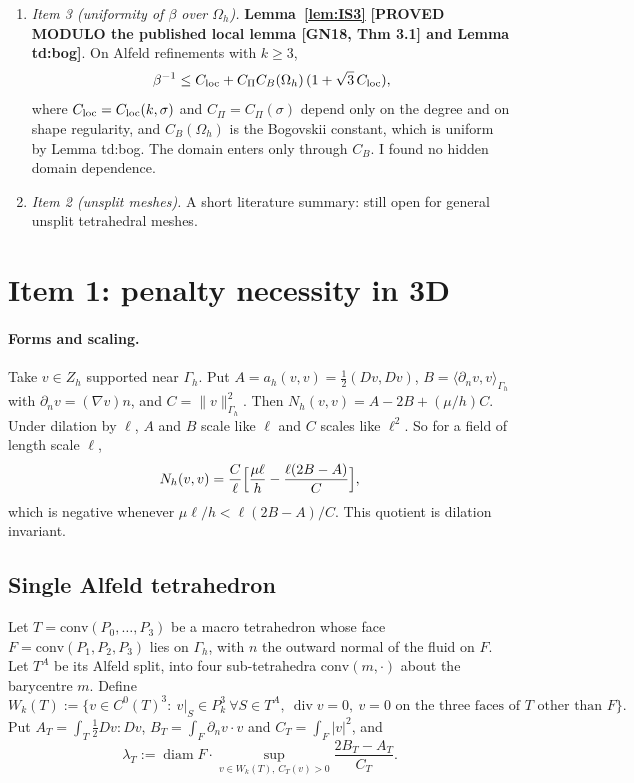 \documentclass[11pt]{article}
\theoremstyle{remark}\newtheorem{remark}[theorem]{Remark}
\newcommand{\Oh}{\Omega_h}\newcommand{\Gh}{\Gamma_h}\newcommand{\hG}{h_\Gamma}\newcommand{\dn}{\partial_n}
\newcommand{\norm}[1]{\|#1\|}\newcommand{\ip}[2]{\langle #1,#2\rangle}\DeclareMathOperator{\curl}{curl}\DeclareMathOperator{\diam}{diam}
\newcommand{\lab}[1]{\textbf{[#1]}}
\begin{document}
\begin{enumerate}[label=(\arabic*)]
\begin{itemize}
\begin{itemize}
 \item This holds for every shape of $T$, including tall ones. \lab{PROVED MODULO (IS3)}, which is itself proved uniform in item~3; $\kappa_0$ is not explicit.
 \end{itemize}
 \end{itemize}
\item \emph{Item 3 (uniformity of $\beta$ over $\Oh$).} \textbf{Lemma~\ref{lem:IS3}} \lab{PROVED MODULO the published local lemma [GN18, Thm 3.1] and Lemma td:bog}. On Alfeld refinements with $k\ge3$,
\[\beta^{-1}\le C_{\rm loc}+C_\Pi C_B(\Oh)\,(1+\sqrt3\,C_{\rm loc}),\]
where $C_{\rm loc}=C_{\rm loc}(k,\sigma)$ and $C_\Pi=C_\Pi(\sigma)$ depend only on the degree and on shape regularity, and $C_B(\Oh)$ is the Bogovskii constant, which is uniform by Lemma td:bog. The domain enters only through $C_B$. I found no hidden domain dependence.
\item \emph{Item 2 (unsplit meshes).} A short literature summary: still open for general unsplit tetrahedral meshes.
\end{enumerate}

\section{Item 1: penalty necessity in 3D}
\paragraph{Forms and scaling.} Take $v\in Z_h$ supported near $\Gh$. Put $A=a_h(v,v)=\tfrac12(Dv,Dv)$, $B=\ip{\dn v}{v}_{\Gh}$ with $\dn v=(\nabla v)n$, and $C=\norm v^2_{\Gh}$. Then $N_h(v,v)=A-2B+(\mu/h)C$. Under dilation by $\ell$, $A$ and $B$ scale like $\ell$ and $C$ scales like $\ell^2$. So for a field of length scale $\ell$,
\[N_h(v,v)=\frac{C}{\ell}\Bigl[\frac{\mu\ell}{h}-\frac{\ell(2B-A)}{C}\Bigr],\]
which is negative whenever $\mu\ell/h<\ell(2B-A)/C$. This quotient is dilation invariant.

\subsection{Single Alfeld tetrahedron}
Let $T=\mathrm{conv}(P_0,\dots,P_3)$ be a macro tetrahedron whose face $F=\mathrm{conv}(P_1,P_2,P_3)$ lies on $\Gh$, with $n$ the outward normal of the fluid on $F$. Let $T^A$ be its Alfeld split, into four sub-tetrahedra $\mathrm{conv}(m,\cdot)$ about the barycentre $m$. Define
\[W_k(T):=\{v\in C^0(T)^3:\ v|_S\in P_k^3\ \forall S\in T^A,\ \operatorname{div}v=0,\ v=0\text{ on the three faces of }T\text{ other than }F\}.\]
Put $A_T=\int_T\tfrac12 Dv:Dv$, $B_T=\int_F\dn v\cdot v$ and $C_T=\int_F|v|^2$, and
\[\lambda_T:=\diam F\cdot\sup_{v\in W_k(T),\,C_T(v)>0}\frac{2B_T-A_T}{C_T}.\]
\end{document}
